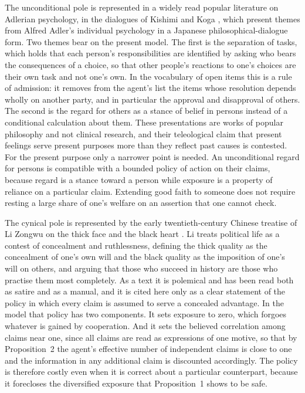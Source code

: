 \documentclass[11pt]{article}
\theoremstyle{definition}
\begin{document}
The unconditional pole is represented in a widely read popular literature on Adlerian psychology, in the dialogues of Kishimi and Koga \cite{kishimi2013, kishimi2016}, which present themes from Alfred Adler's individual psychology \cite{ansbacher1956} in a Japanese philosophical-dialogue form. Two themes bear on the present model. The first is the separation of tasks, which holds that each person's responsibilities are identified by asking who bears the consequences of a choice, so that other people's reactions to one's choices are their own task and not one's own. In the vocabulary of open items this is a rule of admission: it removes from the agent's list the items whose resolution depends wholly on another party, and in particular the approval and disapproval of others. The second is the regard for others as a stance of belief in persons instead of a conditional calculation about them. These presentations are works of popular philosophy and not clinical research, and their teleological claim that present feelings serve present purposes more than they reflect past causes is contested. For the present purpose only a narrower point is needed. An unconditional regard for persons is compatible with a bounded policy of action on their claims, because regard is a stance toward a person while exposure is a property of reliance on a particular claim. Extending good faith to someone does not require resting a large share of one's welfare on an assertion that one cannot check.

The cynical pole is represented by the early twentieth-century Chinese treatise of Li Zongwu on the thick face and the black heart \cite{li1911, chu1992}. Li treats political life as a contest of concealment and ruthlessness, defining the thick quality as the concealment of one's own will and the black quality as the imposition of one's will on others, and arguing that those who succeed in history are those who practise them most completely. As a text it is polemical and has been read both as satire and as a manual, and it is cited here only as a clear statement of the policy in which every claim is assumed to serve a concealed advantage. In the model that policy has two components. It sets exposure to zero, which forgoes whatever is gained by cooperation. And it sets the believed correlation among claims near one, since all claims are read as expressions of one motive, so that by Proposition~2 the agent's effective number of independent claims is close to one and the information in any additional claim is discounted accordingly. The policy is therefore costly even when it is correct about a particular counterpart, because it forecloses the diversified exposure that Proposition~1 shows to be safe.
\end{document}
